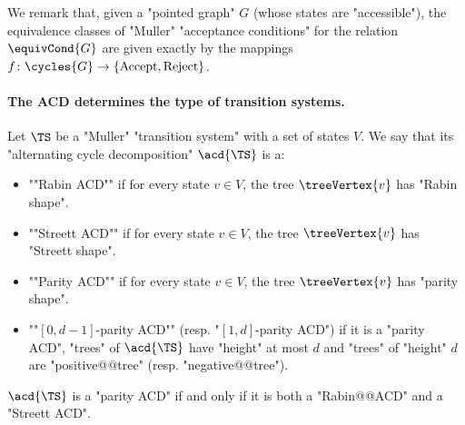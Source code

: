 \documentclass{theoretics}
\begin{document}
We remark that, given a "pointed graph" $G$ (whose states are "accessible"), the equivalence classes of "Muller" "acceptance conditions" for the relation $\equivCond{G}$ are given exactly by the mappings $f\colon \cycles{G} \to \{\mathrm{Accept}, \mathrm{Reject} \}$.



\paragraph*{The ACD determines the type of transition systems.}
\begin{definition}\label{def-cor:ShapesOfACD}
	Let $\TS$ be a "Muller" "transition system" with a set of states $V$. We say that its "alternating cycle decomposition" $\acd{\TS}$ is a:
	\begin{itemize}
		\item  \AP""Rabin ACD"" if for every state $v\in V$, the tree $\treeVertex{v}$ has "Rabin shape".
		
		\item  \AP""Streett ACD"" if for every state $v\in V$, the tree $\treeVertex{v}$ has "Streett shape".
		
		\item  \AP""Parity ACD"" if for every state $v\in V$, the tree $\treeVertex{v}$ has "parity shape".
		\item \AP ""$[0,d-1]$-parity ACD"" (resp. "$[1,d]$-parity ACD") if it is a "parity ACD", "trees" of $\acd{\TS}$ have "height" at most $d$ and "trees" of "height" $d$ are "positive@@tree" (resp. "negative@@tree").
	\end{itemize}
\end{definition}

\begin{remark}\label{rmk-typ:shape-parity-Street-Rabin-ACD}
 $\acd{\TS}$ is a "parity ACD" if and only if it is both a "Rabin@@ACD" and a "Streett ACD". 
\end{remark}
\end{document}
